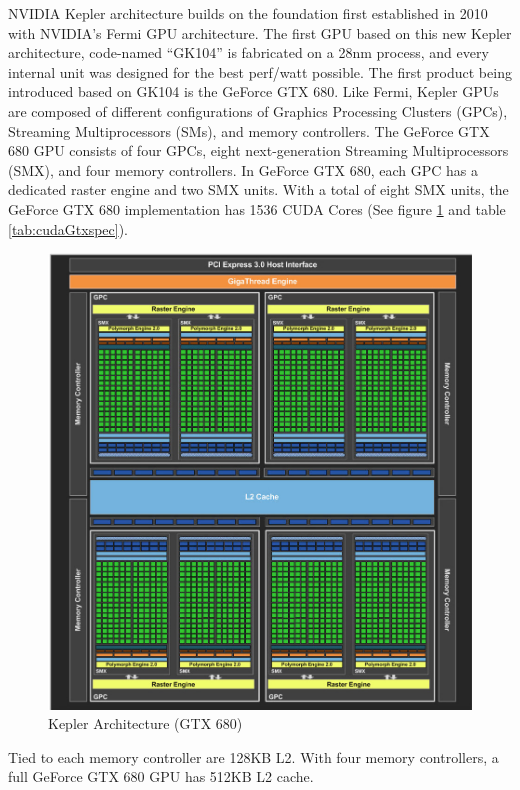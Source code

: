 NVIDIA Kepler architecture builds on the foundation first established in 2010 with NVIDIA's Fermi GPU
architecture.
The first GPU based on this new Kepler architecture, code-named ``GK104'' is
fabricated on a 28nm process, and every internal unit was designed for the best perf/watt possible. The
first product being introduced based on GK104 is the GeForce GTX 680.
Like Fermi, Kepler GPUs are composed of different configurations of Graphics
Processing Clusters (GPCs), Streaming Multiprocessors (SMs), and memory controllers.
The GeForce GTX 680 GPU consists of four GPCs, eight next-generation Streaming
Multiprocessors (SMX), and four memory controllers. In GeForce GTX 680, 
each GPC has a dedicated raster engine and two SMX units. With a total of eight
SMX units, the GeForce GTX 680 implementation has 1536 CUDA Cores (See figure
\ref{gtxArch} and table \ref{tab:cudaGtxspec}).
\begin{figure}
\centering
\includegraphics[scale=0.5]{./images/gtxArch}
\caption{Kepler Architecture (GTX 680)}\label{gtxArch}
\end{figure}
\FloatBarrier
Tied to each memory controller are 128KB L2. 
With four memory controllers, a full GeForce GTX 680 GPU has 512KB
L2 cache.

